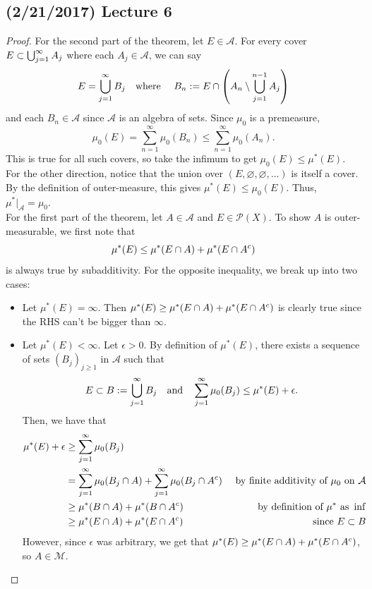 \documentclass[11pt,leqno,oneside]{amsbook}
\numberwithin{thm}{section}
\renewcommand{\P}{\mathcal{P}} %
\renewcommand{\A}{\mathcal{A}} %
\newcommand{\M}{\mathcal{M}} %
\renewcommand{\emptyset}{\varnothing}
\begin{document}
\subsection*{(2/21/2017) Lecture 6}
\begin{proof}
  For the second part of the theorem, let $E \in \A$.  For every cover $E \subset \bigcup_{j=1}^\infty A_j$ where each
  $A_j \in \A$, we can say \[
    E = \bigcup_{j=1}^\infty B_j \quad\text{where}\quad \ B_n := E \cap \left( A_n
      \setminus \bigcup_{j=1}^{n-1} A_j \right)
  \]
  and each $B_n \in \A$ since $\A$ is an algebra of sets. Since
  $\mu_0$ is a premeasure, \[
    \mu_0(E) = \sum_{n=1}^\infty \mu_0(B_n) \leq \sum_{n=1}^\infty \mu_0(A_n).
  \]
  This is true for all such covers, so take the infimum to get $\mu_0(E)
  \leq \mu^*(E)$. For the other direction, notice that the union over
  $(E, \emptyset, \emptyset, \ldots)$ is itself a cover.  By the definition of
  outer-measure, this gives $\mu^*(E) \leq \mu_0(E)$.  Thus, $\mu^*|_\A = \mu_0$. \\

  For the first part of the theorem, let $A \in \A$ and $E \in \P(X)$. To show $A$
  is outer-measurable, we first note that \[
      \mu^*(E) \leq \mu^*(E \cap A) + \mu^*(E \cap A^c)
   \]
   is always true by subadditivity.  For the opposite inequality, we break up into two cases:
  \begin{itemize}
  \item Let $\mu^*(E) = \infty$. Then $\mu^*(E) \geq \mu^*(E \cap A) + \mu^*(E \cap A^c)$ is clearly true since the RHS can't be bigger than $\infty$.
  \item Let $\mu^*(E) < \infty$. Let $\epsilon > 0$. By definition of
    $\mu^*(E)$, there exists a sequence of sets $(B_j)_{j \geq 1}$ in
    $\A$ such that \[
      E \subset B := \bigcup_{j=1}^\infty B_j \quad\text{and}\quad
      \sum_{j=1}^\infty \mu_0(B_j) \leq \mu^*(E) + \epsilon.
    \]
    Then, we have that
    \begin{align*}
      \mu^*(E) + \epsilon & \geq \sum_{j=1}^\infty \mu_0(B_j) \\
& = \sum_{j=1}^\infty \mu_0(B_j \intersect A) + \sum_{j=1}^\infty
  \mu_0(B_j \intersect A^c) & \text{ by finite additivity of }\mu_0
                              \text{ on }\A \\
& \geq \mu^*(B \intersect A) + \mu^*(B \intersect A^c) & \text { by
                                                         definition of
                                                         }\mu^* \text{
                                                         as } \inf \\
& \geq \mu^*(E \intersect A) + \mu^*(E \intersect A^c) & \text{ since
                                                         }E \subset B
    \end{align*}
    However, since $\epsilon$ was arbitrary, we get that $\mu^*(E)
    \geq \mu^*(E \cap A) + \mu^*(E \cap A^c)$, so $A \in
    \M$.
  \end{itemize}
\end{proof}
\end{document}
